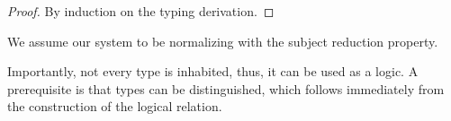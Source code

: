 \documentclass[a4paper,english]{lipics-utf8x}
\newcommand\meta[1]{\noindent\textcolor{blue}{\emph{#1}}}
\begin{document}
  \begin{proof}
    By induction on the typing derivation.
  \end{proof}



  We assume our system to be normalizing with the subject reduction property.


  Importantly, not every type is inhabited, thus, it can be used as a logic.
  A prerequisite is that types can be distinguished, which follows immediately
  from the construction of the logical relation.
\end{document}
